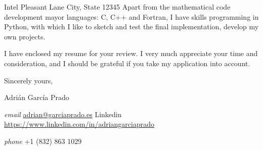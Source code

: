 \documentclass[11pt]{letter} %
\makeatletter
\newcommand{\PersonalEntry}[3]{
\noindent
\small \textit{#1}\hspace{1.5em} #2 #3 \newline}
\newcommand{\fullName}{Adri\'an Garc\'ia Prado}
\newcommand{\emailAddress}{adrian@garciaprado.es}
\newcommand{\LinkedinWeb}{https://www.linkedin.com/in/adriangarciaprado}
\newcommand{\phoneMobileLine}{+1 (832) 863 1029}
\newcommand{\companyName}{Intel}
\newcommand{\companyAddress}{123 Pleasant Lane \newline
City, State 12345}
\makeatother
\begin{document}
\begin{letter}{\companyName \newline
\companyAddress \newline
\newline}
Apart from the mathematical code development mayor languages: C, C++ and Fortran, I have skills programming in Python, with which I like to sketch and test the final implementation, develop my own projects.






I have enclosed my resume for your review. I very much appreciate your time and consideration, and I should be grateful if you take my application into account.

\vspace{2em}
Sincerely yours,

\fullName


\vspace{2em}
\PersonalEntry{email}{\href{mailto:\emailAddress}{\emailAddress}}
\PersonalEntry{Linkedin}{\href{\LinkedinWeb}{\LinkedinWeb}}
\PersonalEntry{phone}{\phoneMobileLine}{}


\end{letter}
\end{document}
